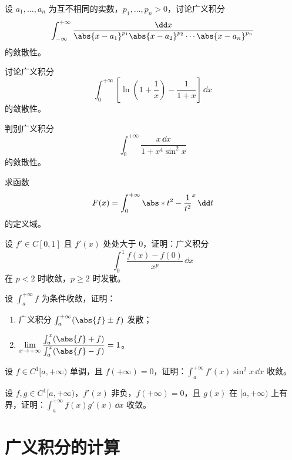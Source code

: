 \begin{xexercise}[3]
设 $a_1,\ldots,a_n$ 为互不相同的实数，$p_1,\ldots,p_n>0$，讨论广义积分
  \[
    \int_{-\infty}^{+\infty}\frac{\dd x}{\abs{x-a_1}^{p_1}\abs{x-a_2}^{p_2}\cdots\abs{x-a_n}^{p_n}}
  \]
  的敛散性。
\end{xexercise}

\begin{xexercise}[4]
讨论广义积分
  \[
    \int_0^{+\infty}\left[\ln\left(1+\frac1x\right)-\frac1{1+x}\right]\,\dd x
  \]
  的敛散性。
\end{xexercise}

\begin{xexercise}[5]
判别广义积分
  \[
    \int_0^{+\infty}\frac{x\,\dd x}{1+x^4\sin^2x}
  \]
  的敛散性。
\end{xexercise}

\begin{xexercise}[6]
求函数
  \[
    F(x)=\int_0^{+\infty}\abs*{t^2-\frac1{t^2}}^x\,\dd t
  \]
  的定义域。
\end{xexercise}

\begin{xexercise}[7]
设 $f'\in C[0,1]$ 且 $f'(x)$ 处处大于 0，证明：广义积分
  \[
    \int_0^1\frac{f(x)-f(0)}{x^p}\,\dd x
  \]
  在 $p<2$ 时收敛，$p\geq2$ 时发散。
\end{xexercise}

\begin{xexercise}[8]
设 $\int_a^{+\infty}f$ 为条件收敛，证明：
  \begin{enumerate}[label=(\arabic*)]
    \item 广义积分 $\int_a^{+\infty}(\abs{f}\pm f)$ 发散；
    \item $\displaystyle\lim_{x\to+\infty}\frac{\int_a^x(\abs{f}+f)}{\int_a^x(\abs{f}-f)}=1$。
  \end{enumerate}
\end{xexercise}

\begin{xexercise}[9]
设 $f\in C^1[a,+\infty)$ 单调，且 $f(+\infty)=0$，证明：$\int_a^{+\infty}f'(x)\sin^2x\,\dd x$ 收敛。
\end{xexercise}

\begin{xexercise}[10]
设 $f,g\in C^1[a,+\infty)$，$f'(x)$ 非负，$f(+\infty)=0$，且 $g(x)$ 在 $[a,+\infty)$ 上有界，证明：$\int_a^{+\infty}f(x)g'(x)\,\dd x$ 收敛。
\end{xexercise}

\section{广义积分的计算}

